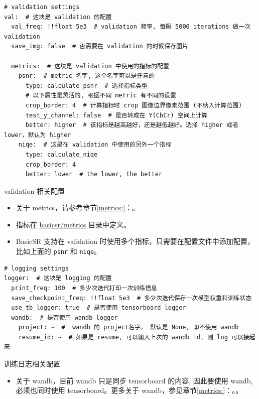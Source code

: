 \documentclass[../main.tex]{subfiles}
\begin{document}
\begin{verbatim}
# validation settings
val:  # 这块是 validation 的配置
  val_freq: !!float 5e3  # validation 频率, 每隔 5000 iterations 做一次 validation
  save_img: false  # 否需要在 validation 的时候保存图片

  metrics:  # 这块是 validation 中使用的指标的配置
    psnr:  # metric 名字, 这个名字可以是任意的
      type: calculate_psnr  # 选择指标类型
      # 以下属性是灵活的, 根据不同 metric 有不同的设置
      crop_border: 4  # 计算指标时 crop 图像边界像素范围 (不纳入计算范围)
      test_y_channel: false  # 是否转成在 Y(CbCr) 空间上计算
      better: higher  # 该指标是越高越好，还是越低越好。选择 higher 或者 lower，默认为 higher
    niqe:  # 这是在 validation 中使用的另外一个指标
      type: calculate_niqe
      crop_border: 4
      better: lower  # the lower, the better
\end{verbatim}

\begin{exampleBox}[righthand ratio=0.00, sidebyside, sidebyside align=center, lower separated=false]{validation 相关配置}
    \begin{itemize}
        \item 关于 metrics，请参考章节\ref{metrics:}：。
        \item 指标在 \href{https://github.com/XPixelGroup/BasicSR/tree/master/basicsr/metrics}{basicsr/metrics} 目录中定义。
        \item BasicSR 支持在 validation 时使用多个指标，只需要在配置文件中添加配置，比如上面的 \texttt{psnr} 和 \texttt{niqe}。
    \end{itemize}
\end{exampleBox}

\begin{verbatim}
# logging settings
logger:  # 这块是 logging 的配置
  print_freq: 100  # 多少次迭代打印一次训练信息
  save_checkpoint_freq: !!float 5e3  # 多少次迭代保存一次模型权重和训练状态
  use_tb_logger: true  # 是否使用 tensorboard logger
  wandb:  # 是否使用 wandb logger
    project: ~  #  wandb 的 project名字。 默认是 None, 即不使用 wandb
    resume_id: ~  # 如果是 resume, 可以输入上次的 wandb id, 则 log 可以接起来
\end{verbatim}

\begin{exampleBox}[righthand ratio=0.00, sidebyside, sidebyside align=center, lower separated=false]{训练日志相关配置}
    \begin{itemize}
        \item 关于 wandb，目前 wandb 只是同步 tensorboard 的内容, 因此要使用 wandb, 必须也同时使用 tensorboard。更多关于 wandb，参见章节\ref{metrics:}：。。
    \end{itemize}
\end{exampleBox}
\end{document}
